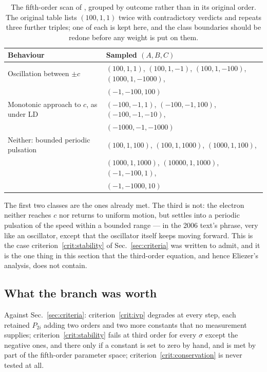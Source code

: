\documentclass[preprint]{aastex701}
\begin{document}
\begin{table}[htb]
\centering
\begin{tabular}{ll}
\toprule
Behaviour & Sampled $(A,B,C)$ \\
\midrule
Oscillation between $\pm c$
  & $(100,1,1)$, $(100,1,-1)$, $(100,1,-100)$, $(1000,1,-1000)$, \\
  & $(-1,-100,100)$ \\[2pt]
Monotonic approach to $c$, as under LD
  & $(-100,-1,1)$, $(-100,-1,100)$, $(-100,-1,-10)$, \\
  & $(-1000,-1,-1000)$ \\[2pt]
Neither: bounded periodic pulsation
  & $(100,1,100)$, $(100,1,1000)$, $(1000,1,100)$, \\
  & $(1000,1,1000)$, $(10000,1,1000)$, $(-1,-100,1)$, \\
  & $(-1,-1000,10)$ \\
\bottomrule
\end{tabular}
\caption{The fifth-order scan of \citet{zhang2006}, grouped by outcome rather
than in its original order. The original table lists $(100,1,1)$ twice with
contradictory verdicts and repeats three further triples; one of each is kept
here, and the class boundaries should be redone before any weight is put on
them.
\label{tab:fifthscan}}
\end{table}

The first two classes are the ones already met. The third is not: the electron
neither reaches $c$ nor returns to uniform motion, but settles into a periodic
pulsation of the speed within a bounded range --- in the 2006 text's phrase,
very like an oscillator, except that the oscillator itself keeps moving forward.
This is the case criterion~\ref{crit:stability} of Sec.~\ref{sec:criteria} was
written to admit, and it is the one thing in this section that the third-order
equation, and hence Eliezer's analysis, does not contain.

\subsection{What the branch was worth}
\label{sec:eliezerscore}

Against Sec.~\ref{sec:criteria}: criterion~\ref{crit:ivp} degrades at every
step, each retained $P_{2i}$ adding two orders and two more constants that no
measurement supplies; criterion~\ref{crit:stability} fails at third order for
every $\sigma$ except the negative ones, and there only if a constant is set to
zero by hand, and is met by part of the fifth-order parameter space;
criterion~\ref{crit:conservation} is never tested at all.
\end{document}
